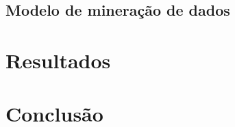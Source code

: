 \documentclass[12pt]{article}
\begin{document}

\subsection{Modelo de mineração de dados}
\label{sec:datamine}

\section{Resultados}
\label{sec:results}

\section{Conclusão}
\label{sec:conclusion}



\end{document}
